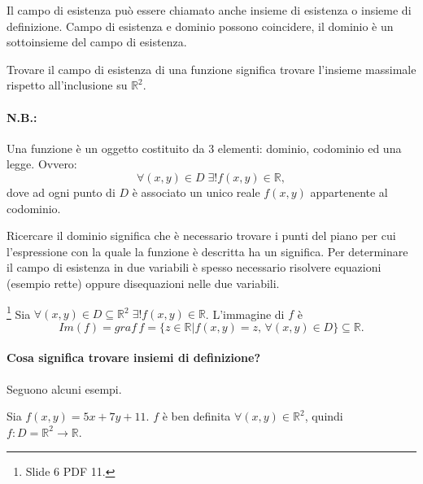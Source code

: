Il campo di esistenza può essere chiamato anche insieme di esistenza o insieme di definizione. Campo di esistenza e dominio possono coincidere, il dominio è un sottoinsieme del campo di esistenza.

\begin{remark}
    Trovare il campo di esistenza di una funzione significa trovare l'insieme massimale rispetto all'inclusione su $\mathbb R^2$.
\end{remark}

\paragraph{N.B.:} Una funzione è un oggetto costituito da 3 elementi: dominio, codominio ed una legge. Ovvero:
\begin{equation*}
    \forall(x,y)\in D\;\exists!f(x,y)\in\mathbb R,
\end{equation*}
dove ad ogni punto di $D$ è associato un unico reale $f(x,y)$ appartenente al codominio.

Ricercare il dominio significa che è necessario trovare i punti del piano per cui l'espressione con la quale la funzione è descritta ha un significa. Per determinare il campo di esistenza in due variabili è spesso necessario risolvere equazioni (esempio rette) oppure disequazioni nelle due variabili.

\begin{definition}[Immagine di $f$]\footnote{Slide 6 PDF 11.}
    Sia $\forall(x,y)\in D\subseteq\mathbb R^2\;\exists!f(x,y)\in\mathbb R$. L'immagine di $f$ è
    \begin{equation*}
        Im(f)=graf\, f=\{z\in\mathbb R| f(x,y)=z,\,\forall(x,y)\in D\}\subseteq\mathbb R.
    \end{equation*}
\end{definition}

\paragraph{Cosa significa trovare insiemi di definizione?} Seguono alcuni esempi.
\begin{example}
    Sia $f(x,y)=5x+7y+11$. $f$ è ben definita $\forall(x,y)\in\mathbb R^2$, quindi $f\colon D=\mathbb R^2\rightarrow \mathbb R$.
\end{example}

